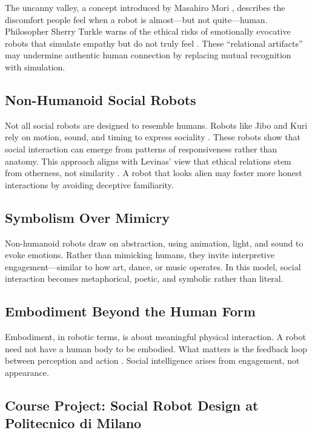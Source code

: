 \documentclass{article}
\begin{document}
The uncanny valley, a concept introduced by Masahiro Mori \citep{mori2012uncanny}, describes the discomfort people feel when a robot is almost—but not quite—human. Philosopher Sherry Turkle warns of the ethical risks of emotionally evocative robots that simulate empathy but do not truly feel \citep{turkle2011}. These “relational artifacts” may undermine authentic human connection by replacing mutual recognition with simulation.

\subsection{Non-Humanoid Social Robots}

Not all social robots are designed to resemble humans. Robots like Jibo and Kuri rely on motion, sound, and timing to express sociality \citep{jibo, kuri}. These robots show that social interaction can emerge from patterns of responsiveness rather than anatomy. This approach aligns with Levinas’ view that ethical relations stem from otherness, not similarity \citep{levinas1969}. A robot that looks alien may foster more honest interactions by avoiding deceptive familiarity.

\subsection{Symbolism Over Mimicry}

Non-humanoid robots draw on abstraction, using animation, light, and sound to evoke emotions. Rather than mimicking humans, they invite interpretive engagement—similar to how art, dance, or music operates. In this model, social interaction becomes metaphorical, poetic, and symbolic rather than literal.

\subsection{Embodiment Beyond the Human Form}

Embodiment, in robotic terms, is about meaningful physical interaction. A robot need not have a human body to be embodied. What matters is the feedback loop between perception and action \citep{dreyfus2002}. Social intelligence arises from engagement, not appearance.

\subsection{Course Project: Social Robot Design at Politecnico di Milano}
\end{document}
